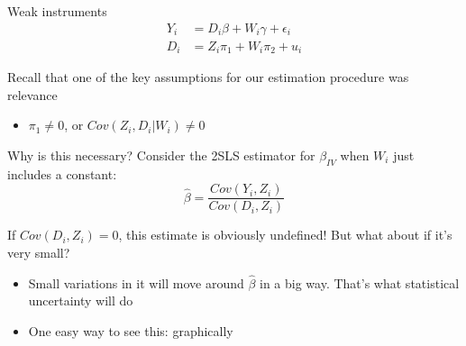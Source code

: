 \documentclass[notes,11pt, aspectratio=169]{beamer}
\newenvironment{wideitemize}{\itemize\addtolength{\itemsep}{10pt}}{\enditemize}
\begin{document}
\begin{frame}{Weak instruments}
  \begin{align*}
    Y_{i} &= D_{i}\beta + W_{i}\gamma + \epsilon_{i}\\
    D_{i} &= Z_{i}\pi_{1} + W_{i}\pi_{2} + u_{i}
  \end{align*}
  \begin{wideitemize}
  \item Recall that one of the key assumptions for our estimation
    procedure was relevance
    \begin{itemize}
    \item $\pi_{1} \not= 0$, or $Cov(Z_{i}, D_{i} | W_{i}) \not= 0$
    \end{itemize}
  \item Why is this necessary? Consider the 2SLS estimator for
    $\beta_{IV}$ when $W_{i}$ just includes a constant:
    $$\hat{\beta} = \frac{Cov(Y_{i}, Z_{i})}{Cov(D_{i}, Z_{i})}$$
  \item If $Cov(D_{i}, Z_{i}) = 0$, this estimate is obviously undefined! But what about if it's very small?
    \begin{itemize}
    \item Small variations in it will move around $\hat{\beta}$ in a
      big way. That's what statistical uncertainty will do
    \item One easy way to see this: graphically
    \end{itemize}
  \end{wideitemize}
\end{frame}
\end{document}
